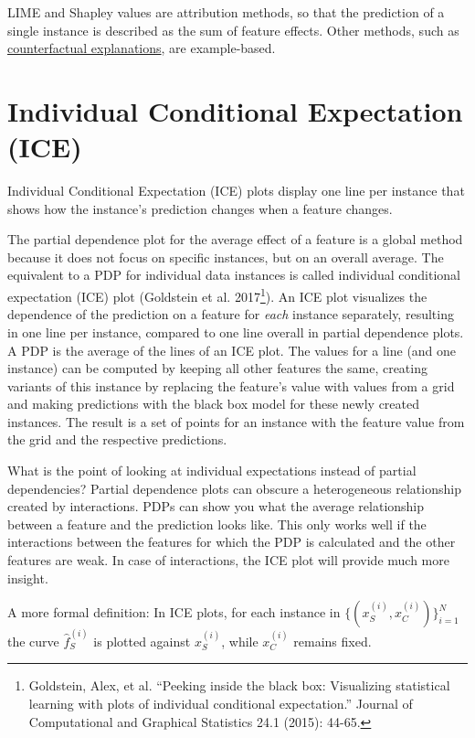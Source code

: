 \documentclass[12pt,]{krantz}
\begin{document}
LIME and Shapley values are attribution methods, so that the prediction
of a single instance is described as the sum of feature effects. Other
methods, such as \protect\hyperlink{counterfactual}{counterfactual
explanations}, are example-based.

\newpage

\hypertarget{ice}{\section{Individual Conditional Expectation
(ICE)}\label{ice}}

Individual Conditional Expectation (ICE) plots display one line per
instance that shows how the instance's prediction changes when a feature
changes.

The partial dependence plot for the average effect of a feature is a
global method because it does not focus on specific instances, but on an
overall average. The equivalent to a PDP for individual data instances
is called individual conditional expectation (ICE) plot (Goldstein et
al. 2017\footnote{Goldstein, Alex, et al. ``Peeking inside the black
  box: Visualizing statistical learning with plots of individual
  conditional expectation.'' Journal of Computational and Graphical
  Statistics 24.1 (2015): 44-65.}). An ICE plot visualizes the
dependence of the prediction on a feature for \emph{each} instance
separately, resulting in one line per instance, compared to one line
overall in partial dependence plots. A PDP is the average of the lines
of an ICE plot. The values for a line (and one instance) can be computed
by keeping all other features the same, creating variants of this
instance by replacing the feature's value with values from a grid and
making predictions with the black box model for these newly created
instances. The result is a set of points for an instance with the
feature value from the grid and the respective predictions.

What is the point of looking at individual expectations instead of
partial dependencies? Partial dependence plots can obscure a
heterogeneous relationship created by interactions. PDPs can show you
what the average relationship between a feature and the prediction looks
like. This only works well if the interactions between the features for
which the PDP is calculated and the other features are weak. In case of
interactions, the ICE plot will provide much more insight.

A more formal definition: In ICE plots, for each instance in
\(\{(x_{S}^{(i)},x_{C}^{(i)})\}_{i=1}^N\) the curve \(\hat{f}_S^{(i)}\)
is plotted against \(x^{(i)}_{S}\), while \(x^{(i)}_{C}\) remains fixed.
\end{document}
